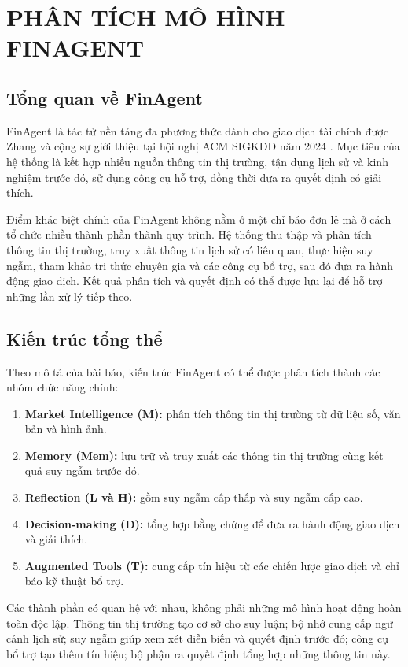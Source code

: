 \chapter{PHÂN TÍCH MÔ HÌNH FINAGENT}

\section{Tổng quan về FinAgent}

FinAgent là tác tử nền tảng đa phương thức dành cho giao dịch tài chính được Zhang và cộng sự giới thiệu tại hội nghị ACM SIGKDD năm 2024 \cite{zhang2024finagent}. Mục tiêu của hệ thống là kết hợp nhiều nguồn thông tin thị trường, tận dụng lịch sử và kinh nghiệm trước đó, sử dụng công cụ hỗ trợ, đồng thời đưa ra quyết định có giải thích.

Điểm khác biệt chính của FinAgent không nằm ở một chỉ báo đơn lẻ mà ở cách tổ chức nhiều thành phần thành quy trình. Hệ thống thu thập và phân tích thông tin thị trường, truy xuất thông tin lịch sử có liên quan, thực hiện suy ngẫm, tham khảo tri thức chuyên gia và các công cụ bổ trợ, sau đó đưa ra hành động giao dịch. Kết quả phân tích và quyết định có thể được lưu lại để hỗ trợ những lần xử lý tiếp theo.

\section{Kiến trúc tổng thể}

Theo mô tả của bài báo, kiến trúc FinAgent có thể được phân tích thành các nhóm chức năng chính:
\begin{enumerate}
    \item \textbf{Market Intelligence (M):} phân tích thông tin thị trường từ dữ liệu số, văn bản và hình ảnh.
    \item \textbf{Memory (Mem):} lưu trữ và truy xuất các thông tin thị trường cùng kết quả suy ngẫm trước đó.
    \item \textbf{Reflection (L và H):} gồm suy ngẫm cấp thấp và suy ngẫm cấp cao.
    \item \textbf{Decision-making (D):} tổng hợp bằng chứng để đưa ra hành động giao dịch và giải thích.
    \item \textbf{Augmented Tools (T):} cung cấp tín hiệu từ các chiến lược giao dịch và chỉ báo kỹ thuật bổ trợ.
\end{enumerate}
Các thành phần có quan hệ với nhau, không phải những mô hình hoạt động hoàn toàn độc lập. Thông tin thị trường tạo cơ sở cho suy luận; bộ nhớ cung cấp ngữ cảnh lịch sử; suy ngẫm giúp xem xét diễn biến và quyết định trước đó; công cụ bổ trợ tạo thêm tín hiệu; bộ phận ra quyết định tổng hợp những thông tin này.

